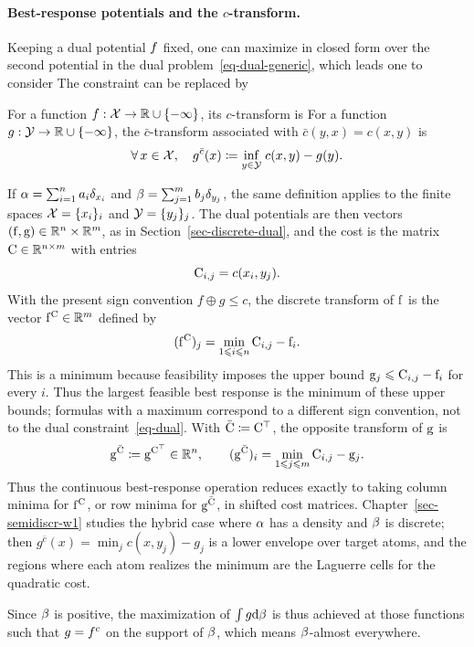 \paragraph{Best-response potentials and the $c$-transform.}

Keeping a dual potential $f$ fixed, one can maximize in closed form over the second potential in the dual problem~\eqref{eq-dual-generic}, which leads one to consider
The constraint can be replaced by

\begin{defn}[$c$-transform]\label{def-c-transform}
	For a function $f:\mathcal{X}\to\mathbb{R}\cup\{-\infty\}$, its $c$-transform is
	For a function $g:\mathcal{Y}\to\mathbb{R}\cup\{-\infty\}$, the $\bar c$-transform associated with $\bar c(y,x)=c(x,y)$ is
	\[
		\forall \, x \in \mathcal{X}, \quad
		g^{\bar{c}}(x) \coloneqq \underset{y \in \mathcal{Y}}{\inf}\; c(x,y) - g(y).
	\]
\end{defn}
\begin{rem}\label{rem-discrete-c-transform}
	If $\alpha=\sum_{i=1}^n a_i\delta_{x_i}$ and $\beta=\sum_{j=1}^m b_j\delta_{y_j}$, the same definition applies to the finite spaces $\mathcal{X}=\{x_i\}_i$ and $\mathcal{Y}=\{y_j\}_j$. The dual potentials are then vectors $(\mathrm{f},\mathrm{g})\in\mathbb{R}^n\times\mathbb{R}^m$, as in Section~\ref{sec-discrete-dual}, and the cost is the matrix $\mathrm{C}\in\mathbb{R}^{n\times m}$ with entries
	\[
		\mathrm{C}_{i,j}=c(x_i,y_j).
	\]
	With the present sign convention $f\oplus g\leq c$, the discrete transform of $\mathrm{f}$ is the vector $\mathrm{f}^{\mathrm{C}}\in\mathbb{R}^m$ defined by
	\[
		(\mathrm{f}^{\mathrm{C}})_j
		=
		\min_{1\leqslant i\leqslant n} \mathrm{C}_{i,j}-\mathrm{f}_i.
	\]
	This is a minimum because feasibility imposes the upper bound $\mathrm{g}_j\leqslant \mathrm{C}_{i,j}-\mathrm{f}_i$ for every $i$. Thus the largest feasible best response is the minimum of these upper bounds; formulas with a maximum correspond to a different sign convention, not to the dual constraint~\eqref{eq-dual}.
	With $\bar{\mathrm{C}}\coloneqq\mathrm{C}^\top$, the opposite transform of $\mathrm{g}$ is
	\[
		\mathrm{g}^{\bar{\mathrm{C}}}\coloneqq \mathrm{g}^{\mathrm{C}^\top}\in\mathbb{R}^n,
		\qquad
		(\mathrm{g}^{\bar{\mathrm{C}}})_i
		=
		\min_{1\leqslant j\leqslant m} \mathrm{C}_{i,j}-\mathrm{g}_j.
	\]
	Thus the continuous best-response operation reduces exactly to taking column minima for $\mathrm{f}^{\mathrm{C}}$, or row minima for $\mathrm{g}^{\bar{\mathrm{C}}}$, in shifted cost matrices. Chapter~\ref{sec-semidiscr-w1} studies the hybrid case where $\alpha$ has a density and $\beta$ is discrete; then $g^{\bar c}(x)=\min_j c(x,y_j)-g_j$ is a lower envelope over target atoms, and the regions where each atom realizes the minimum are the Laguerre cells for the quadratic cost.
\end{rem}
Since $\beta$ is positive, the maximization of $\int g \mathrm{d} \beta$ is thus achieved at those functions such that $g=f^c$ on the support of $\beta$, which means $\beta$-almost everywhere.

